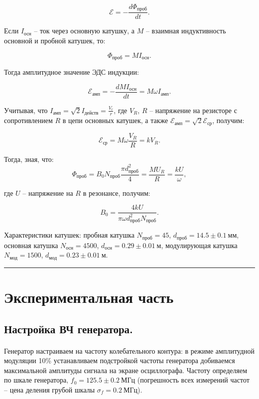 \documentclass[a4paper,12pt]{article} %
\begin{document}
\[
\mathcal{E} = - \dfrac{d\Phi_{\text{проб}}}{dt}.
\]

Если $I_{\text{осн}}$ -- ток через основную катушку, а $M$ -- взаимная индуктивность основной и пробной катушек, то:

\[
\Phi_{\text{проб}} = M I_{\text{осн}}.
\]

Тогда амплитудное значение ЭДС индукции:

\[
\mathcal{E}_{\text{амп}} = - \dfrac{dM I_{\text{осн}}}{dt} = M \omega I_{\text{амп}}.
\]

Учитывая, что $I_{\text{амп}} = \sqrt{2} I_{\text{действ}}=\frac{V_r}{r}$, где $V_R$, $R$ -- напряжение на резисторе с сопротивлением $R$ в цепи основных катушек, а также $\mathcal{E}_{\text{амп}} = \sqrt{2}\mathcal{E}_{\text{ср}}$, получим:

\[
\mathcal{E}_{\text{ср}} = M \omega \dfrac{V_R}{R} = k V_R.
\]

Тогда, зная, что:
\[
\Phi_{\text{проб}} = B_0 N_{\text{проб}} \dfrac{\pi d_{\text{проб}}^2}{4} =  \dfrac{MU_R}{R} = \dfrac{k U}{\omega},
\]

\noindent где $U$ -- напряжение на $R$ в резонансе, получим:

\begin{equation}
\label{e:1}
B_0 = \dfrac{4k U}{\pi \omega d^2_{\text{проб}} N_{\text{проб}}}.
\end{equation}

Характеристики катушек: пробная катушка $N_{\text{проб}} = 45$, $d_{\text{проб}} = 14.5\pm 0.1~\text{мм}$, основная катушка $N_{\text{осн}} = 4500$, $d_{\text{осн}} = 0.29\pm 0.01~\text{м}$,  модулирующая катушка $N_{\text{мод}} = 1500$, $d_{\text{мод}} = 0.23\pm 0.01~\text{м}$.


\medskip\hrule\medskip

\section{Экспериментальная часть}

\subsection{Настройка ВЧ генератора.}

\paragraph{}Генератор настраиваем на частоту колебательного контура: в режиме амплитудной модуляции 10\% устанавливаем подстройкой частоты генератора добиваемся максимальной амплитуды сигнала на экране осциллографа. Частоту определяем по шкале генератора, $f_0 = 125.5 \pm 0.2~\text{МГц}$ (погрешность всех измерений частот -- цена деления грубой шкалы $\sigma_f = 0.2~\text{МГц}$). 
\end{document}
